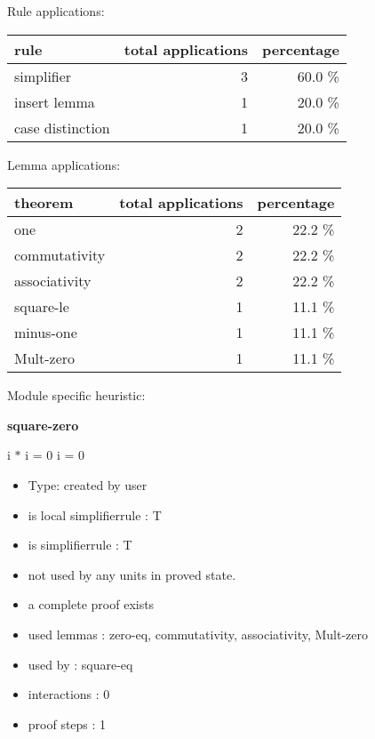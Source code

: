 \documentclass[a4paper]{article}
\begin{document}
Rule applications:

\begin{supertabular}{l|r|r}
rule	        & total applications & percentage \\ \hline
simplifier & 3 & 60.0 \% \\
insert lemma & 1 & 20.0 \% \\
case distinction & 1 & 20.0 \% \\

\end{supertabular}

Lemma applications:

\begin{supertabular}{l|r|r}
theorem	        & total applications & percentage \\ \hline
one & 2 & 22.2 \% \\
commutativity & 2 & 22.2 \% \\
associativity & 2 & 22.2 \% \\
square-le & 1 & 11.1 \% \\
minus-one & 1 & 11.1 \% \\
Mult-zero & 1 & 11.1 \% \\

\end{supertabular}

Module specific heuristic:

\pagebreak

{\LARGE\bf square-zero}\label{lemma-square-zero}

\medskip

 \Fol i $*$ i = 0 \Equiv i = 0

\begin{itemize}

\item Type: created by user

\item is local simplifierrule : T
\item is simplifierrule : T
\item not used by any units in proved state.
\item       a complete proof exists
\item       used lemmas  : zero-eq, commutativity, associativity, Mult-zero
\item       used by      : square-eq
\item       interactions : 0
\item       proof steps  : 1
\end{itemize}
\end{document}
